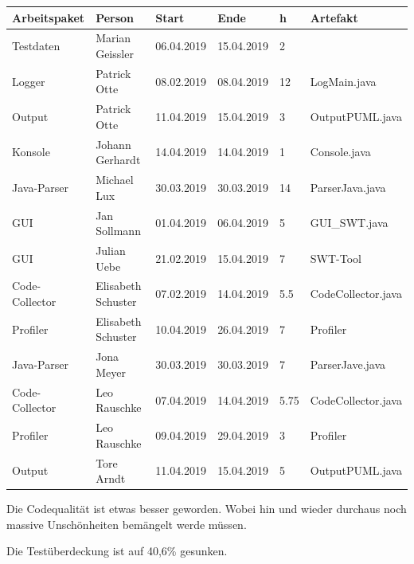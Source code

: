 \begin{longtable}{|p{4cm}|l|l|l|l|l|}
        \hline
        Arbeitspaket & Person & Start & Ende & h & Artefakt\\
        \hline
        Testdaten & Marian Geissler   & 06.04.2019 & 15.04.2019 & 2 &  \\ \hline
        Logger & Patrick Otte   & 08.02.2019 & 08.04.2019 & 12 & LogMain.java \\ \hline
        Output & Patrick Otte   & 11.04.2019 & 15.04.2019 & 3 & OutputPUML.java \\ \hline
        Konsole & Johann Gerhardt   & 14.04.2019 & 14.04.2019 & 1 & Console.java \\ \hline
        Java-Parser & Michael Lux   & 30.03.2019 & 30.03.2019 & 14 & ParserJava.java\\ \hline
        GUI & Jan Sollmann  & 01.04.2019 & 06.04.2019 & 5 & GUI\_SWT.java \\ \hline
        GUI & Julian Uebe  & 21.02.2019 & 15.04.2019 & 7 & SWT-Tool \\ \hline
        Code-Collector & Elisabeth Schuster  & 07.02.2019 & 14.04.2019 & 5.5  & CodeCollector.java \\ \hline
        Profiler & Elisabeth Schuster  & 10.04.2019 & 26.04.2019 & 7  & Profiler \\ \hline
       Java-Parser & Jona Meyer  & 30.03.2019 & 30.03.2019 & 7 & ParserJave.java \\ \hline
        Code-Collector & Leo Rauschke  & 07.04.2019 & 14.04.2019 & 5.75 & CodeCollector.java \\ \hline
        Profiler & Leo Rauschke  & 09.04.2019 & 29.04.2019 & 3 & Profiler\\ \hline
        Output & Tore Arndt  & 11.04.2019 & 15.04.2019 & 5 & OutputPUML.java\\ \hline
        
        
\end{longtable}     
\nsecend

Die Codequalität ist etwas besser geworden. Wobei hin und wieder durchaus noch massive Unschönheiten bemängelt werde müssen.
\nsecend

Die Testüberdeckung ist auf 40,6\% gesunken.
\nsecend

